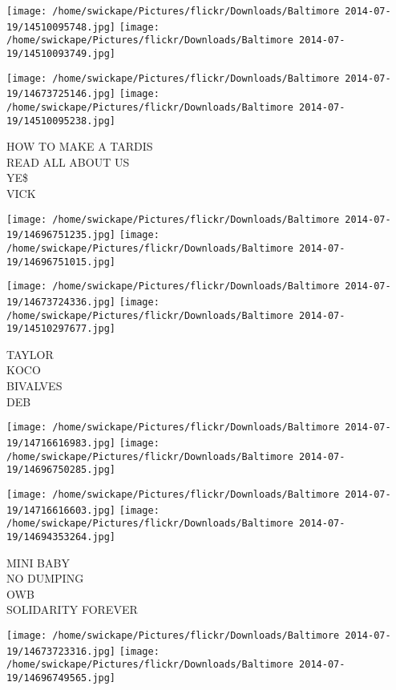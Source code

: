 \documentclass[10pt,letterpaper]{article}
\begin{document}
\texttt{[image: /home/swickape/Pictures/flickr/Downloads/Baltimore 2014-07-19/14510095748.jpg]}
\texttt{[image: /home/swickape/Pictures/flickr/Downloads/Baltimore 2014-07-19/14510093749.jpg]}

\texttt{[image: /home/swickape/Pictures/flickr/Downloads/Baltimore 2014-07-19/14673725146.jpg]}
\texttt{[image: /home/swickape/Pictures/flickr/Downloads/Baltimore 2014-07-19/14510095238.jpg]}

HOW TO MAKE A TARDIS\\
READ ALL ABOUT US\\
YE\$\\
VICK\\
\pagebreak

\texttt{[image: /home/swickape/Pictures/flickr/Downloads/Baltimore 2014-07-19/14696751235.jpg]}
\texttt{[image: /home/swickape/Pictures/flickr/Downloads/Baltimore 2014-07-19/14696751015.jpg]}

\texttt{[image: /home/swickape/Pictures/flickr/Downloads/Baltimore 2014-07-19/14673724336.jpg]}
\texttt{[image: /home/swickape/Pictures/flickr/Downloads/Baltimore 2014-07-19/14510297677.jpg]}

TAYLOR\\
KOCO\\
BIVALVES\\
DEB\\
\pagebreak

\texttt{[image: /home/swickape/Pictures/flickr/Downloads/Baltimore 2014-07-19/14716616983.jpg]}
\texttt{[image: /home/swickape/Pictures/flickr/Downloads/Baltimore 2014-07-19/14696750285.jpg]}

\texttt{[image: /home/swickape/Pictures/flickr/Downloads/Baltimore 2014-07-19/14716616603.jpg]}
\texttt{[image: /home/swickape/Pictures/flickr/Downloads/Baltimore 2014-07-19/14694353264.jpg]}

MINI BABY\\
NO DUMPING\\
OWB\\
SOLIDARITY FOREVER\\
\pagebreak

\texttt{[image: /home/swickape/Pictures/flickr/Downloads/Baltimore 2014-07-19/14673723316.jpg]}
\texttt{[image: /home/swickape/Pictures/flickr/Downloads/Baltimore 2014-07-19/14696749565.jpg]}
\end{document}
